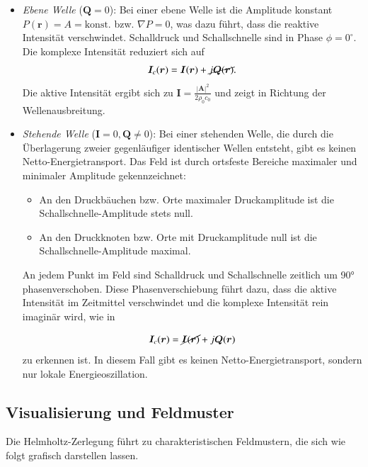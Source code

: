 \begin{itemize}


 
\item \emph{Ebene Welle} ($\boldsymbol{Q} = 0$):
%
Bei einer ebene Welle ist die Amplitude konstant $P(\boldsymbol{r})
= A = \text{konst.}$ bzw. $\nabla P = 0$, was dazu führt, dass die
reaktive Intensität verschwindet. Schalldruck und Schallschnelle
sind in Phase $\phi = 0^{\circ}$. Die komplexe Intensität reduziert
sich auf
\begin{equation}
\boldsymbol{I}_c (\boldsymbol{r})
=
\boldsymbol{I}(\boldsymbol{r}) + \cancel{j\boldsymbol{Q}(\boldsymbol{r})}.
\end{equation}
Die aktive Intensität ergibt sich zu
$\boldsymbol{I} = \frac{|\boldsymbol{A}|^2}{2 \rho_0 c_0}$
und zeigt in Richtung der
Wellenausbreitung.
 
\item \emph{Stehende Welle} ($\boldsymbol{I} = 0, \boldsymbol{Q} \neq 0$):
%
Bei einer stehenden Welle, die durch die Überlagerung zweier
gegenläufiger identischer Wellen entsteht, gibt es keinen
Netto-Energietransport. Das Feld ist durch ortsfeste Bereiche
maximaler und minimaler Amplitude gekennzeichnet:
    \begin{itemize}
	\item An den Druckbäuchen bzw. Orte maximaler Druckamplitude
	ist die Schall\-schnel\-le-Amplitude stets null.
%
	\item An den Druckknoten bzw. Orte mit Druckamplitude null
	ist die Schall\-schnel\-le-Amplitude maximal.
%
    \end{itemize}
An jedem Punkt im Feld sind Schalldruck und Schallschnelle zeitlich um 90° phasenverschoben. Diese Phasenverschiebung führt dazu, dass die aktive Intensität im Zeitmittel verschwindet und die komplexe Intensität rein imaginär wird, wie in 
 
\begin{equation}
\boldsymbol{I}_c (\boldsymbol{r})
=
\cancel{\boldsymbol{I}(\boldsymbol{r})} + j\boldsymbol{Q}(\boldsymbol{r})
\end{equation}
zu erkennen ist. In diesem Fall gibt es keinen Netto-Energietransport, sondern nur lokale Energieoszillation.
\end{itemize}



\subsection{Visualisierung und Feldmuster
\label{helmholtz:subsection:Visualisierung}}
Die Helmholtz-Zerlegung führt zu charakteristischen Feldmustern, die sich wie folgt grafisch darstellen lassen.
 
